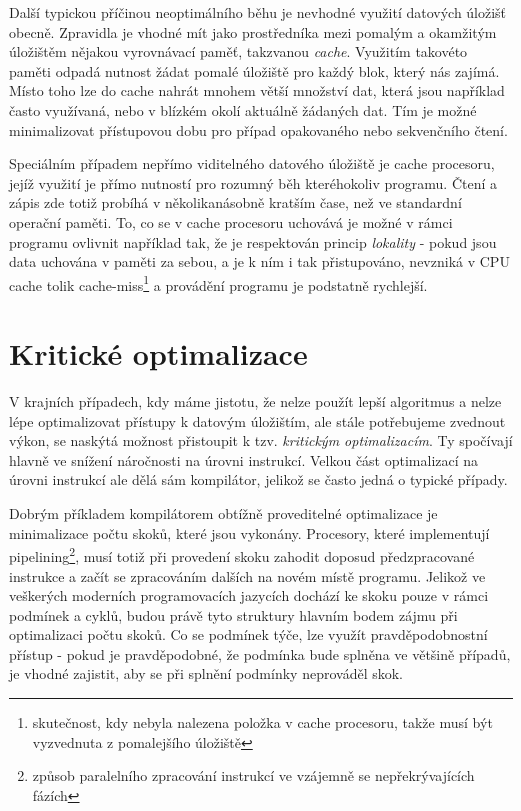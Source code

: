 \documentclass[czech,BP]{thesiskiv}
\begin{document}
Další typickou příčinou neoptimálního běhu je nevhodné využití datových úložišť obecně. Zpravidla je vhodné mít jako prostředníka mezi pomalým a okamžitým úložištěm nějakou vyrovnávací paměť, takzvanou \emph{cache}. Využitím takovéto paměti odpadá nutnost žádat pomalé úložiště pro každý blok, který nás zajímá. Místo toho lze do cache nahrát mnohem větší množství dat, která jsou například často využívaná, nebo v blízkém okolí aktuálně žádaných dat. Tím je možné minimalizovat přístupovou dobu pro případ opakovaného nebo sekvenčního čtení.

Speciálním případem nepřímo viditelného datového úložiště je cache procesoru, jejíž využití je přímo nutností pro rozumný běh kteréhokoliv programu. Čtení a zápis zde totiž probíhá v několikanásobně kratším čase, než ve standardní operační paměti. To, co se v cache procesoru uchovává je možné v rámci programu ovlivnit například tak, že je respektován princip \emph{lokality} - pokud jsou data uchována v paměti za sebou, a je k ním i tak přistupováno, nevzniká v CPU cache tolik cache-miss\footnote{skutečnost, kdy nebyla nalezena položka v cache procesoru, takže musí být vyzvednuta z pomalejšího úložiště} a provádění programu je podstatně rychlejší.

\section{Kritické optimalizace}

V krajních případech, kdy máme jistotu, že nelze použít lepší algoritmus a nelze lépe optimalizovat přístupy k datovým úložištím, ale stále potřebujeme zvednout výkon, se naskýtá možnost přistoupit k tzv. \emph{kritickým optimalizacím}. Ty spočívají hlavně ve snížení náročnosti na úrovni instrukcí. Velkou část optimalizací na úrovni instrukcí ale dělá sám kompilátor, jelikož se často jedná o typické případy.

Dobrým příkladem kompilátorem obtížně proveditelné optimalizace je minimalizace počtu skoků, které jsou vykonány. Procesory, které implementují pipelining\footnote{způsob paralelního zpracování instrukcí ve vzájemně se nepřekrývajících fázích}, musí totiž při provedení skoku zahodit doposud předzpracované instrukce a začít se zpracováním dalších na novém místě programu. Jelikož ve veškerých moderních programovacích jazycích dochází ke skoku pouze v rámci podmínek a cyklů, budou právě tyto struktury hlavním bodem zájmu při optimalizaci počtu skoků. Co se podmínek týče, lze využít pravděpodobnostní přístup - pokud je pravděpodobné, že podmínka bude splněna ve většině případů, je vhodné zajistit, aby se při splnění podmínky neprováděl skok.
\end{document}
